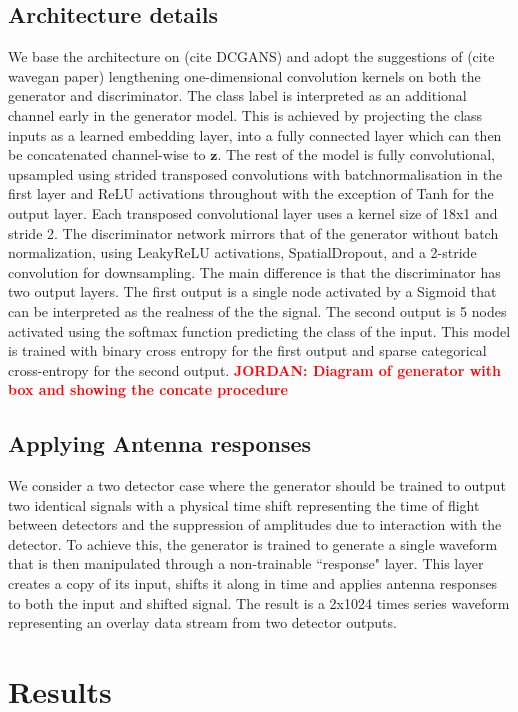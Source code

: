 \documentclass[12pt]{iopart}
\newcommand{\jordan}[1]{\textbf{\textcolor{red}{JORDAN: #1}}}
\begin{document}
\subsection{Architecture details}
We base the architecture on (cite DCGANS) and adopt the suggestions of (cite wavegan paper) lengthening one-dimensional convolution kernels on both the generator and discriminator. The class label is interpreted as an additional channel early in the generator model. This is achieved by projecting the class inputs as a learned embedding layer, into a fully connected layer which can then be concatenated channel-wise to $\textbf{z}$. The rest of the model is fully convolutional, upsampled using strided transposed convolutions with batchnormalisation in the first layer and ReLU activations throughout with the exception of Tanh for the output layer. Each transposed convolutional layer uses a kernel size of 18x1 and stride 2.
The discriminator network mirrors that of the generator without batch normalization, using LeakyReLU activations, SpatialDropout, and a 2-stride convolution for downsampling. The main difference is that the discriminator has two output layers. The first output is a single node activated by a Sigmoid that can be interpreted as the realness of the the signal. The second output is 5 nodes activated using the softmax function predicting the class of the input. This model is trained with binary cross entropy for the first output and sparse categorical cross-entropy for the second output. \jordan{Diagram of generator with box and showing the concate procedure}

\subsection{Applying Antenna responses}
We consider a two detector case where the generator should be trained to output two identical signals with a physical time shift representing the time of flight between detectors and the suppression of amplitudes due to interaction with the detector. To achieve this, the generator is trained to generate a single waveform that is then manipulated through a non-trainable ``response" layer. This layer creates a copy of its input, shifts it along in time and applies antenna responses to both the input and shifted signal. The result is a 2x1024 times series waveform representing an overlay data stream from two detector outputs. 

\section{Results}
\end{document}
